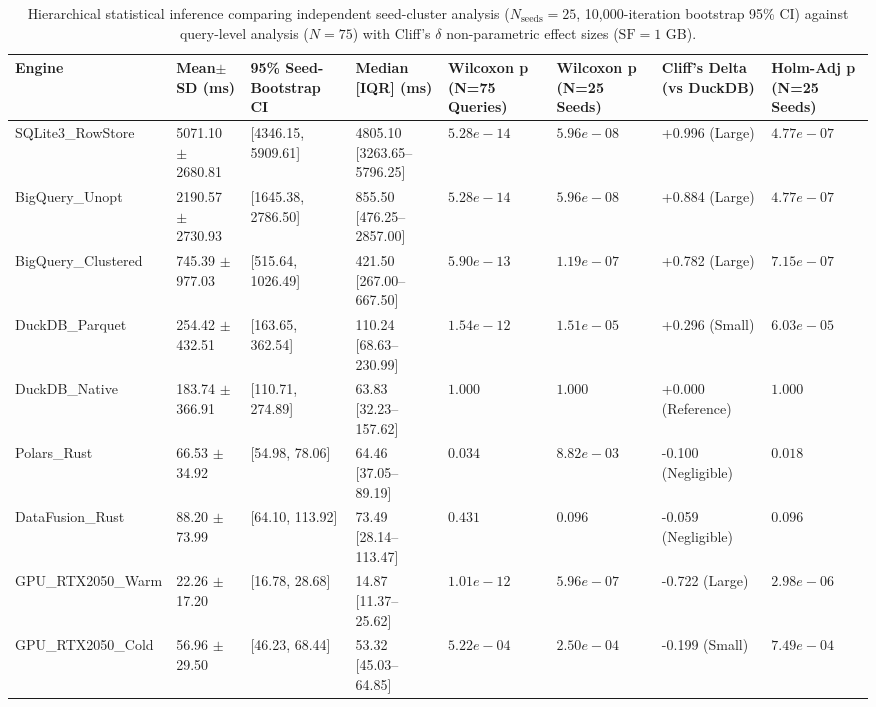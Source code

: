 \begin{table}[htbp]
\centering
\scriptsize
\setlength{\tabcolsep}{3.5pt}
\caption{Hierarchical statistical inference comparing independent seed-cluster analysis ($N_{\text{seeds}}=25$, 10,000-iteration bootstrap 95\% CI) against query-level analysis ($N=75$) with Cliff's $\delta$ non-parametric effect sizes ($\text{SF}=1$ GB).}
\label{tab:hierarchical_stats}
\begin{tabular}{@{}llllllll@{}}
\toprule
\textbf{Engine} & \textbf{Mean$\pm$SD (ms)} & \textbf{95\% Seed-Bootstrap CI} & \textbf{Median [IQR] (ms)} & \textbf{Wilcoxon p (N=75 Queries)} & \textbf{Wilcoxon p (N=25 Seeds)} & \textbf{Cliff's Delta (vs DuckDB)} & \textbf{Holm-Adj p (N=25 Seeds)} \\
\midrule
SQLite3\_RowStore & 5071.10 $\pm$ 2680.81 & [4346.15, 5909.61] & 4805.10 [3263.65–5796.25] & $5.28e-14$ & $5.96e-08$ & +0.996 (Large) & $4.77e-07$ \\
BigQuery\_Unopt & 2190.57 $\pm$ 2730.93 & [1645.38, 2786.50] & 855.50 [476.25–2857.00] & $5.28e-14$ & $5.96e-08$ & +0.884 (Large) & $4.77e-07$ \\
BigQuery\_Clustered & 745.39 $\pm$ 977.03 & [515.64, 1026.49] & 421.50 [267.00–667.50] & $5.90e-13$ & $1.19e-07$ & +0.782 (Large) & $7.15e-07$ \\
DuckDB\_Parquet & 254.42 $\pm$ 432.51 & [163.65, 362.54] & 110.24 [68.63–230.99] & $1.54e-12$ & $1.51e-05$ & +0.296 (Small) & $6.03e-05$ \\
DuckDB\_Native & 183.74 $\pm$ 366.91 & [110.71, 274.89] & 63.83 [32.23–157.62] & $1.000$ & $1.000$ & +0.000 (Reference) & $1.000$ \\
Polars\_Rust & 66.53 $\pm$ 34.92 & [54.98, 78.06] & 64.46 [37.05–89.19] & $0.034$ & $8.82e-03$ & -0.100 (Negligible) & $0.018$ \\
DataFusion\_Rust & 88.20 $\pm$ 73.99 & [64.10, 113.92] & 73.49 [28.14–113.47] & $0.431$ & $0.096$ & -0.059 (Negligible) & $0.096$ \\
GPU\_RTX2050\_Warm & 22.26 $\pm$ 17.20 & [16.78, 28.68] & 14.87 [11.37–25.62] & $1.01e-12$ & $5.96e-07$ & -0.722 (Large) & $2.98e-06$ \\
GPU\_RTX2050\_Cold & 56.96 $\pm$ 29.50 & [46.23, 68.44] & 53.32 [45.03–64.85] & $5.22e-04$ & $2.50e-04$ & -0.199 (Small) & $7.49e-04$ \\
\bottomrule
\end{tabular}
\end{table}